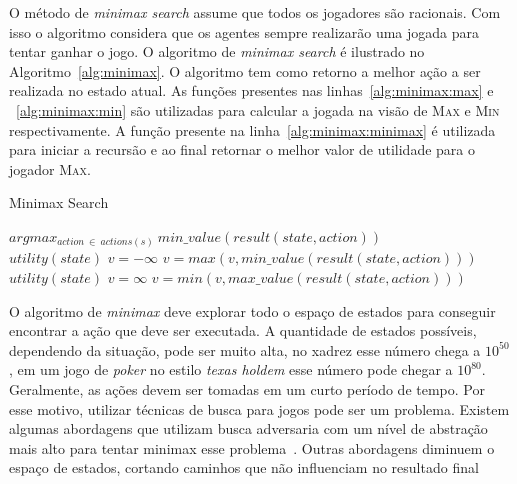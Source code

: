 O método de \textit{minimax search} assume que todos os jogadores são racionais.
Com isso o algoritmo considera que os agentes sempre realizarão uma jogada para tentar ganhar o jogo.
O algoritmo de \textit{minimax search} é ilustrado no Algoritmo~\ref{alg:minimax}. 
O algoritmo tem como retorno a melhor ação a ser realizada no estado atual. 
As funções presentes nas linhas~\ref{alg:minimax:max} e ~\ref{alg:minimax:min} são utilizadas para calcular a jogada na visão de \textsc{Max} e \textsc{Min} respectivamente.
A função presente na linha~\ref{alg:minimax:minimax} é utilizada para iniciar a recursão e ao final retornar o melhor valor de utilidade para o jogador \textsc{Max}.

\begin{algorithm}
	\caption{Minimax Search}
	\label{alg:minimax}
	\begin{algorithmic}[1]	
		 \label{alg:minimax:minimax}
		\State \Return $arg max_{action~ \in~ actions(s)}~ min\_value(result(state,  action)) $
		\EndFunction \\
		\label{alg:minimax:max}
		\State	\Return $utility(state)$
		\EndIf
		\State $v = -\infty$
		\State $v = max(v, min\_value(result(state,action)))$
		\EndFor	
		\EndFunction \\
		\label{alg:minimax:min}
		\State	\Return $utility(state)$
		\EndIf
		\State $v = \infty$
		\State $v = min(v, max\_value(result(state,action)))$
		\EndFor	
		\EndFunction
	\end{algorithmic}
\end{algorithm}


O algoritmo de \textit{minimax} deve explorar todo o espaço de estados para conseguir encontrar a ação que deve ser executada. 
A quantidade de estados possíveis, dependendo da situação, pode ser muito alta, no xadrez esse número chega a $10^{50}$, em um jogo de \textit{poker} no estilo \textit{texas holdem} esse número pode chegar a $10^{80}$. 
Geralmente, as ações devem ser tomadas em um curto período de tempo. 
Por esse motivo, utilizar técnicas de busca para jogos pode ser um problema. 
Existem algumas abordagens que utilizam busca adversaria com um nível de abstração mais alto para tentar minimax esse problema~\cite{ontanon2013survey}. Outras abordagens diminuem o espaço de estados, cortando caminhos que não influenciam no resultado final~\cite[Capítulo 5]{intelligence2003modern}
